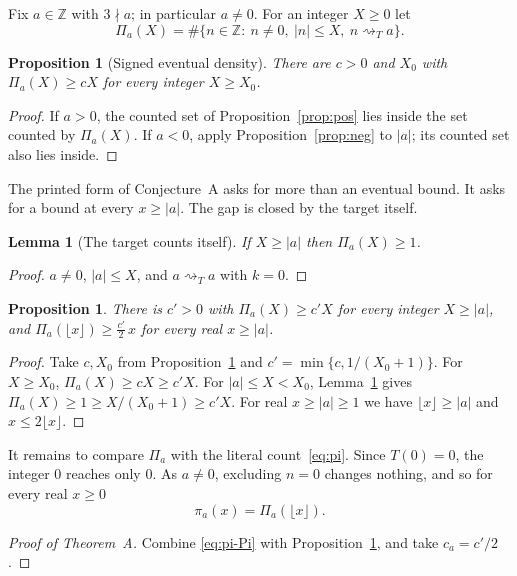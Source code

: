 \documentclass[11pt]{amsart}
\newtheorem{lemma}[theorem]{Lemma}
\newtheorem{proposition}[theorem]{Proposition}
\theoremstyle{definition}
\theoremstyle{remark}
\newcommand{\Z}{\mathbb{Z}}
\newcommand{\reach}[1]{\mathrel{\rightsquigarrow_{#1}}}
\begin{document}
Fix $a\in\Z$ with $3\nmid a$; in particular $a\ne0$. For an integer $X\ge0$ let
\[
  \Pi_a(X)=\#\{n\in\Z:\ n\ne0,\ |n|\le X,\ n\reach{T}a\}.
\]

\begin{proposition}[Signed eventual density]\label{prop:eventual}
There are $c>0$ and $X_0$ with $\Pi_a(X)\ge cX$ for every integer $X\ge X_0$.
\end{proposition}

\begin{proof}
If $a>0$, the counted set of Proposition~\ref{prop:pos} lies inside the set counted by $\Pi_a(X)$.
If $a<0$, apply Proposition~\ref{prop:neg} to $|a|$; its counted set also lies inside.
\end{proof}

The printed form of Conjecture~A asks for more than an eventual bound. It asks for a bound at every
$x\ge|a|$. The gap is closed by the target itself.

\begin{lemma}[The target counts itself]\label{lem:self}
If $X\ge|a|$ then $\Pi_a(X)\ge1$.
\end{lemma}

\begin{proof}
$a\ne0$, $|a|\le X$, and $a\reach{T}a$ with $k=0$.
\end{proof}

\begin{proposition}\label{prop:threshold}
There is $c'>0$ with $\Pi_a(X)\ge c'X$ for every integer $X\ge|a|$, and
$\Pi_a(\lfloor x\rfloor)\ge\frac{c'}{2}\,x$ for every real $x\ge|a|$.
\end{proposition}

\begin{proof}
Take $c,X_0$ from Proposition~\ref{prop:eventual} and $c'=\min\{c,1/(X_0+1)\}$. For $X\ge X_0$,
$\Pi_a(X)\ge cX\ge c'X$. For $|a|\le X<X_0$, Lemma~\ref{lem:self} gives $\Pi_a(X)\ge1\ge
X/(X_0+1)\ge c'X$. For real $x\ge|a|\ge1$ we have $\lfloor x\rfloor\ge|a|$ and $x\le2\lfloor
x\rfloor$.
\end{proof}

It remains to compare $\Pi_a$ with the literal count~\eqref{eq:pi}. Since $T(0)=0$, the integer $0$
reaches only $0$. As $a\ne0$, excluding $n=0$ changes nothing, and so for every real $x\ge0$
\begin{equation}\label{eq:pi-Pi}
  \pi_a(x)=\Pi_a(\lfloor x\rfloor).
\end{equation}

\begin{proof}[Proof of Theorem~A]
Combine \eqref{eq:pi-Pi} with Proposition~\ref{prop:threshold}, and take $c_a=c'/2$.
\end{proof}
\end{document}
